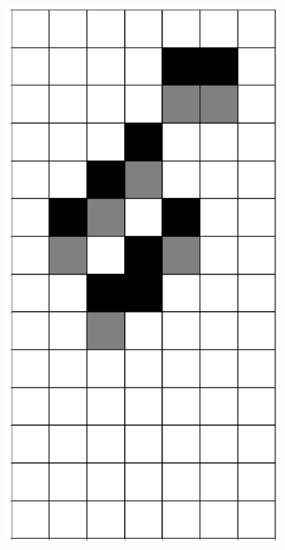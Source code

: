 \documentclass[12pt]{article}
\numberwithin{figure}{section} %
\begin{document}
\begin{figure}[H]
\begin{subfigure}{0.18\textwidth}
     		\includegraphics[width=\linewidth]{Section4/15.4}
     		\subcaption{}
   	\end{subfigure}
      	\newline
   	\setcounter{subfigure}{0}


\end{figure}
\end{document}
